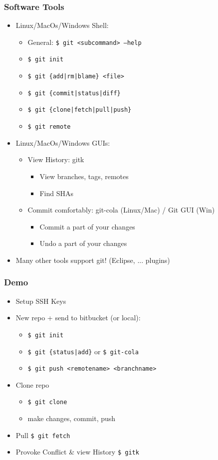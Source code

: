 \documentclass[ignoreframetext,envcountsect]{beamer}
\newif\ifsnop\snoptrue
\newcommand{\bi}{\begin{itemize}}
\newcommand{\ei}{\end{itemize}}
\begin{document}
\ifsnop
\begin{frame}
\frametitle{Software Tools}
\bi
\item
  Linux/MacOs/Windows Shell:
  \bi
  \item General: {\tt \$ git <subcommand> --help}
  \item {\tt \$ git init}
  \item {\tt \$ git \{add|rm|blame\} <file> }
  \item {\tt \$ git \{commit|status|diff\} }
  \item {\tt \$ git \{clone|fetch|pull|push\} }
  \item {\tt \$ git remote }
  \ei
\item
  Linux/MacOs/Windows GUIs:
  \bi
  \item View History: gitk
    \bi
    \item View branches, tags, remotes
    \item Find SHAs
    \ei
  \item Commit comfortably: git-cola (Linux/Mac) / Git GUI (Win)
    \bi
    \item Commit a part of your changes
    \item Undo a part of your changes
    \ei
  \ei
\item
  Many other tools support git! (Eclipse, ... plugins)
\ei
\end{frame}
\fi


\ifsnop
\begin{frame}
\frametitle{Demo}
\bi
\item Setup SSH Keys %
\item New repo + send to bitbucket (or local):
  \bi
  \item {\tt \$ git init}
  \item {\tt \$ git \{status|add\}} or {\tt \$ git-cola}
  \item {\tt \$ git push <remotename> <branchname>}
  \ei
\item Clone repo
  \bi
  \item {\tt \$ git clone}
  \item make changes, commit, push
  \ei
\item Pull {\tt \$ git fetch}
\item Provoke Conflict \& view History {\tt \$ gitk}
\ei
\end{frame}
\fi
\end{document}
